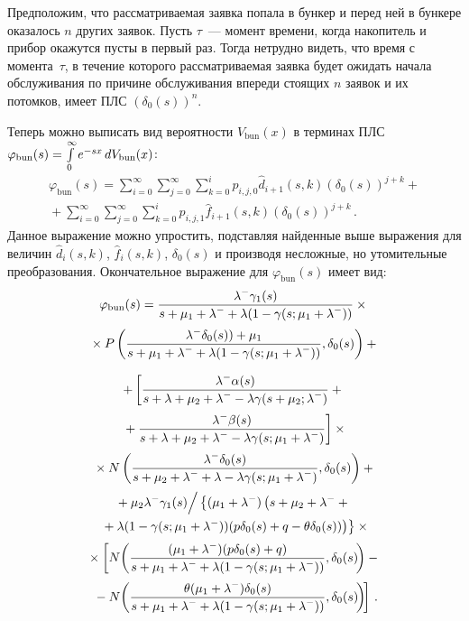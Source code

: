 \begin{multicols}{2}
Предположим, что рассматриваемая заявка попала в бункер
и перед ней в бункере оказалось $n$ других заявок.
Пусть $\tau$~--- момент времени, когда накопитель и прибор
окажутся пусты в первый раз.
Тогда нетрудно видеть, что время с момента~$\tau$, в течение которого рассматриваемая заявка будет
ожидать начала обслуживания по причине обслуживания впереди стоящих $n$ заявок и их потомков,
имеет ПЛС $(\delta_0(s))^n$.

Теперь можно выписать вид вероятности $V_{\mathrm{bun}}(x)$ в терминах ПЛС
$\varphi_{\mathrm{bun}}(s)\hm= \int\limits_0^{\infty} e^{-sx}\,dV_{\mathrm{bun}}(x)$:
\begin{multline*}
\varphi_{\mathrm{bun}}(s) = \sum\limits_{i=0}^\infty
\sum\limits_{j=0}^\infty \sum\limits_{k=0}^{i}
p_{i,j,0} \hat d_{i+1}(s,k) (\delta_0(s))^{j+k}
+ {}\\[2pt]
{}+\sum\limits_{i=0}^\infty \sum\limits_{j=0}^\infty
\sum\limits_{k=0}^{i} p_{i,j,1}
\hat f_{i+1}(s,k) (\delta_0(s))^{j+k}\,.
\end{multline*}
Данное выражение можно упростить,
подставляя найденные выше выражения для величин $\hat d_{i}(s,k)$,
$\hat f_{i}(s,k)$, $\delta_0(s)$ и производя
несложные, но утомительные преобразования.
Окончательное выражение для $\varphi_{\mathrm{bun}}(s)$ имеет вид:
\begin{multline*}
\varphi_{\mathrm{bun}}(s) = \displaystyle\frac{\displaystyle \lambda^- \gamma_1(s)\mathstrut}{\displaystyle s + \mu_1 + \lambda^- + \lambda (1 - \gamma(s;\mu_1 + \lambda^-))\mathstrut}
\times{}\\[2pt]
{}\times
P \left( \displaystyle\frac{\displaystyle \lambda^- \delta_0(s)  ) + \mu_1 \mathstrut}{\displaystyle 
s + \mu_1 + \lambda^- + \lambda (1 - \gamma(s;\mu_1 + \lambda^-))\mathstrut}, \delta_0(s)
\right)
+{}
\end{multline*}

\noindent
\begin{multline*}
+
\left [
\fr{\lambda^- \alpha (s) }{s+\lambda+\mu_2 + \lambda^- - \lambda \gamma(s+\mu_2;\lambda^-)}
+{}
\right.\\[2pt]
\left.{}+\fr{\lambda^- \beta (s) }{s+\lambda+\mu_2 + \lambda^- - \lambda \gamma(s; \mu_1 + \lambda^-)}
\right]
\times{}
\\[2pt]
{}\times
N \left ( \fr{ \lambda^- \delta_0(s)  }{
s+\mu_2+\lambda^- + \lambda - \lambda \gamma(s; \mu_1+ \lambda^-)}, \delta_0(s)
\right )+{}
\\[2pt]
{}+
{ \mu_2 \lambda^- \gamma_1(s)}\Big /\left\{(\mu_1+\lambda^-)\left(s + \mu_2 + \lambda^- +{}\right.\right.\\
\left.\left.{}+ \lambda (1 - \gamma(s;\mu_1 + \lambda^-))(p \delta_0(s)  
+q- \theta \delta_0(s))\right)\right\}
\times{}
\\[2pt]
{}\times \left [
N \!\left ( \fr{ (\mu_1+\lambda^-)(p \delta_0(s)  +q)  }{
s + \mu_1 + \lambda^- + \lambda (1 - \gamma(s;\mu_1 + \lambda^-))}, \delta_0(s)
\!\right )
- {}\right.\\[2pt]
\!\!\left.{}-
N\! \left (
\fr{ \theta(\mu_1+\lambda^-)  \delta_0(s)   }{
s + \mu_1 + \lambda^- + \lambda (1 - \gamma(s;\mu_1 + \lambda^-))}, \delta_0(s)
\!\right )\! \right ]\,.\hspace*{-3.9619pt}
\end{multline*}


\end{multicols}
